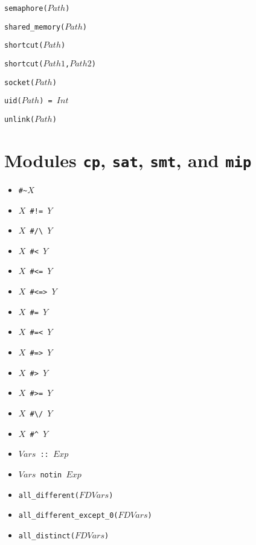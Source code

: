 \documentclass[10pt]{article}
\begin{document}
\begin{multicols}{2}
\begin{scriptsize}
\begin{itemize}
{\item \texttt{semaphore($Path$)}
\item \texttt{shared\_memory($Path$)}
\item \texttt{shortcut($Path$)}
\item \texttt{shortcut($Path1$,$Path2$)}
\item \texttt{socket($Path$)}
\item \texttt{uid($Path$) = $Int$}
\item \texttt{unlink($Path$)}
}
\end{itemize}
\end{scriptsize}

\section*{Modules \texttt{cp}, \texttt{sat}, \texttt{smt}, and \texttt{mip}}
\begin{scriptsize}
\begin{itemize}
    \item {\tt \verb+#~+$X$}
    \item {\tt $X$ \verb+#!=+ $Y$} 
    \item {\tt $X$ \verb+#/\+ $Y$}
    \item {\tt $X$ \verb+#<+ $Y$} 
    \item {\tt $X$ \verb+#<=+ $Y$}
    \item {\tt $X$ \verb+#<=>+ $Y$}
    \item {\tt $X$ \verb+#=+ $Y$} 
    \item {\tt $X$ \verb+#=<+ $Y$} 
    \item {\tt $X$ \verb+#=>+ $Y$}
    \item {\tt $X$ \verb+#>+ $Y$} 
    \item {\tt $X$ \verb+#>=+ $Y$} 
    \item {\tt $X$ \verb+#\/+ $Y$}
    \item {\tt $X$ \verb+#^+ $Y$}
\item \texttt{$Vars$ :: $Exp$}
\item \texttt{$Vars$ notin $Exp$}
\item \texttt{all\_different($FDVars$)}
\item \texttt{all\_different\_except\_0($FDVars$)}
\item \texttt{all\_distinct($FDVars$)}

\end{itemize}
\end{scriptsize}
\end{multicols}
\end{document}
